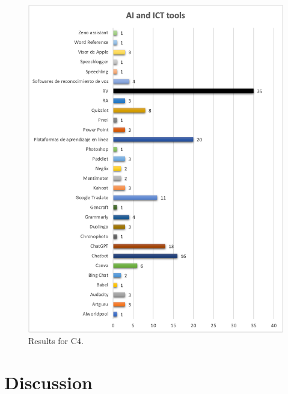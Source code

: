 \documentclass[english]{textolivre}
\begin{document}
\begin{figure}[h!]
    \centering
    \begin{minipage}{0.90\linewidth}
    \includegraphics[width=\linewidth]{Images/image4.png}
    \caption{Results for C4.}
    \label{fig-4}
    \end{minipage}
\end{figure}


\section{Discussion}
\end{document}
